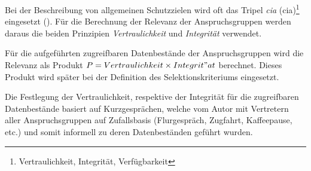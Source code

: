 \documentclass[../../main.tex]{subfiles}
\begin{document}
\begin{sloppypar}
Bei der Beschreibung von allgemeinen Schutzzielen wird oft das Tripel \textit{\acrlong{cia}} (\acrshort{cia})\footnote{Vertraulichkeit, Integrität, Verfügbarkeit} eingesetzt (\cite{harris_cissp_2013}). Für die Berechnung der Relevanz der Anspruchsgruppen werden daraus die beiden Prinzipien \textit{Vertraulichkeit} und \textit{Integrität} verwendet.

Für die aufgeführten zugreifbaren Datenbestände der Anspruchsgruppen wird die Relevanz als Produkt $P =  Vertraulichkeit \times Integrit"at$ berechnet. Dieses Produkt wird später bei der Definition des Selektionskriteriums eingesetzt. 

Die Festlegung der Vertraulichkeit, respektive der Integrität für die zugreifbaren Datenbestände basiert auf Kurzgesprächen, welche vom Autor mit Vertretern aller Anspruchsgruppen auf Zufallsbasis (Flurgespräch, Zugfahrt, Kaffeepause, etc.) und somit informell  zu deren Datenbeständen geführt wurden. 
\end{sloppypar}

\end{document}
